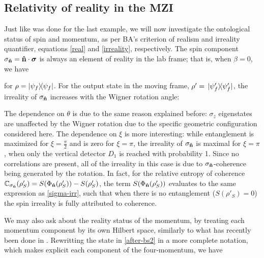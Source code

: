 \documentclass[12pt,a4paper,notitlepage]{report}
\begin{document}
\subsection{Relativity of reality in the MZI}

Just like was done for the last example, we will now investigate the ontological status of spin and momentum, as per BA's criterion of realism and irreality quantifier, equations \eqref{real} and \eqref{irreality}, respectively.
The spin component $\sigma_{\vu{n}} = \vu{n}\cdot\vb*{\sigma}$ is always an element of reality in the lab frame; that is, when $\beta = 0$, we have

%
for $\rho = \dyad{\psi_f}$. For the output state in the moving frame, $\rho' = \dyad*{\psi'_f}$, the irreality of $\sigma_{\vu{n}}$ increases with the Wigner rotation angle:

%
The dependence on $\theta$ is due to the same reason explained before: $\sigma_z$ eigenstates are unaffected by the Wigner rotation due to the specific geometric configuration considered here. The dependence on $\xi$ is more interesting: while entanglement is maximized for $\xi=\frac{\pi}{2}$ and is zero for $\xi=\pi$, the irreality of $\sigma_{\vu{n}}$ is maximal for $\xi=\pi$, when only the vertical detector $D_1$ is reached with probability 1. Since no correlations are present, all of the irreality in this case is due to $\sigma_{\vu{n}}$-coherence being generated by the rotation. In fact, for the relative entropy of coherence $\mathbb{C}_{\sigma_{\vu{n}}}(\rho'_S) = S(\Phi_{\vu{n}}(\rho'_S)) - S(\rho'_S)$, the term $S(\Phi_{\vu{n}}(\rho'_S))$ evaluates to the same expression as \eqref{sigma-irr}, such that when there is no entanglement ($S(\rho'_S) = 0$) the spin irreality is fully attributed to coherence.

We may also ask about the reality status of the momentum, by treating each momentum component by its own Hilbert space, similarly to what has recently been done in \cite{petreca_2021}. Rewritting the state in \eqref{after-bs2} in a more complete notation, which makes explicit each component of the four-momentum, we have
\end{document}

